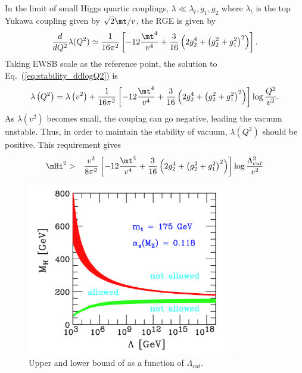 In the limit of small Higgs quartic couplings, $\lambda \ll \lambda_t, g_1, g_2$ 
where $\lambda_t$ is the top Yukawa coupling given by $\sqrt{2} \mt / v$, the RGE is 
given by \cite{Djouadi20081}
\begin{eqnarray}
\label{eq:stability_ddlogQ2}
\frac{d}{dQ^2} \lambda (Q^2)  
\simeq
\frac{1}{16\pi^2}  
\left[ -12 \frac{\mt^4}{v^4} + \frac{3}{16} \left(2g_2^4 + \left(g_2^2+g_1^2\right)^2 \right)   \right].
\end{eqnarray} 
Taking EWSB scale as the reference point, the solution to Eq.~(\ref{eq:stability_ddlogQ2}) is  
\begin{eqnarray} 
\lambda\left(Q^2\right) 
= 
\lambda\left(v^2\right)  
+ 
\frac{1}{16\pi^2}  \left[ -12 \frac{\mt^4}{v^4} 
                          + \frac{3}{16} \left(2g_2^4 + \left(g_2^2+g_1^2\right)^2 \right) \right]
                    \log \frac{Q^2}{v^2}.
\end{eqnarray} 
As $\lambda(v^2)$ becomes small, the couping can go negative, leading the vacuum unstable.   
Thus, in order to maintain the stability of vacuum, $\lambda\left(Q^2\right)$ should be 
positive. This requirement gives
\begin{eqnarray} 
\mHi^2 
&>&
\frac{v^2}{8\pi^2}  \left[ -12 \frac{\mt^4}{v^4} 
                          + \frac{3}{16} \left(2g_2^4 + \left(g_2^2+g_1^2\right)^2 \right) \right]
                    \log \frac{\Lambda_{cut}^2}{v^2} 
\end{eqnarray} 
%
\begin{figure}[t]
\centering
\includegraphics[width=0.8\textwidth]{figures/trivial_vacstab.pdf}
\caption{ Upper and lower bound of \mHi as a function of $\Lambda_{cut}$.
}
\label{fig:trivial_vacstab}
\end{figure}
\\

